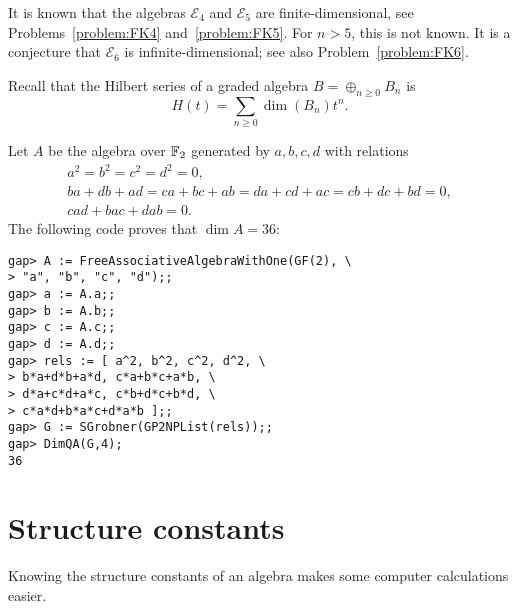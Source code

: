 \begin{remark}
	It is known that the algebras $\mathcal{E}_4$ and $\mathcal{E}_5$ are finite-dimensional, see
	Problems~\ref{problem:FK4} and~\ref{problem:FK5}. For $n>5$, this is not known. It is a conjecture that $\mathcal{E}_6$
	is infinite-dimensional; see also Problem~\ref{problem:FK6}.
\end{remark}

Recall that the Hilbert
series of a graded algebra $B=\oplus_{n\geq0}B_n$ is 
\[
H(t)=\sum_{n\geq0}\dim (B_n)t^n.
\]

\begin{example}
	Let $A$ be the algebra over $\mathbb{F}_2$ generated by $a,b,c,d$ with relations
	\begin{gather*}
		a^2=b^2=c^2=d^2=0,\\
		ba+db+ad=ca+bc+ab=da+cd+ac=cb+dc+bd=0,\\
		cad+bac+dab=0.
	\end{gather*}
	The following code proves that $\dim A=36$: 

\begin{lstlisting}
gap> A := FreeAssociativeAlgebraWithOne(GF(2), \
> "a", "b", "c", "d");;
gap> a := A.a;;
gap> b := A.b;;
gap> c := A.c;;
gap> d := A.d;;
gap> rels := [ a^2, b^2, c^2, d^2, \
> b*a+d*b+a*d, c*a+b*c+a*b, \
> d*a+c*d+a*c, c*b+d*c+b*d, \
> c*a*d+b*a*c+d*a*b ];;
gap> G := SGrobner(GP2NPList(rels));;
gap> DimQA(G,4);
36
\end{lstlisting}
\end{example}

\section{Structure constants}

Knowing the structure constants of an algebra makes some computer calculations
easier. 

